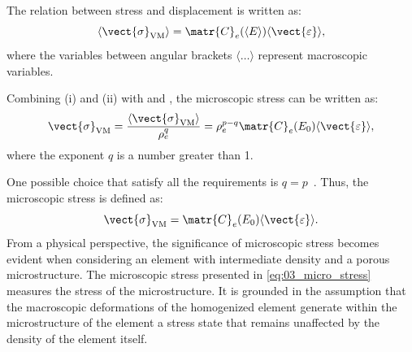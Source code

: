 The relation between stress and displacement is written as:
\begin{equation}
    \langle \vect{\sigma}_{\text{VM}} \rangle = \matr{C}_e(\langle E \rangle) \langle \vect{\varepsilon} \rangle,
    \label{eq:03_stress_disp}
\end{equation}
where the variables between angular brackets $\langle \dots \rangle$ represent macroscopic variables.

Combining (i) and (ii) with  and , the microscopic stress can be written as:
\begin{equation}
    \vect{\sigma}_{\text{VM}} = \frac{\langle \vect{\sigma}_{\text{VM}} \rangle}{\rho^q_e} = \rho_e^{p-q} \matr{C}_e(E_0)\langle \vect{\varepsilon} \rangle,
\end{equation}
where the exponent $q$ is a number greater than 1.

One possible choice that satisfy all the requirements is $q=p$~. Thus, the microscopic stress is defined as:
\begin{equation}
    \vect{\sigma}_{\text{VM}} = \matr{C}_e(E_0)\langle \vect{\varepsilon} \rangle.
    \label{eq:03_micro_stress}
\end{equation}
From a physical perspective, the significance of microscopic stress becomes evident when considering an element with intermediate density and a porous microstructure. The microscopic stress presented in \eqref{eq:03_micro_stress} measures the stress of the microstructure. It is grounded in the assumption that the macroscopic deformations of the homogenized element generate within the microstructure of the element a stress state that remains unaffected by the density of the element itself.

